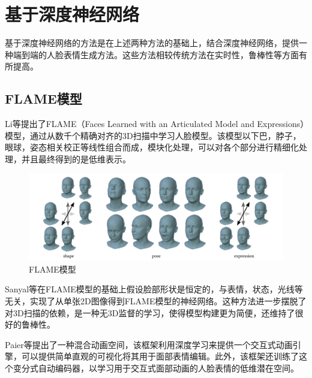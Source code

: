 \documentclass{ctexart}
\begin{document}
\section{\hei 基于深度神经网络}
基于深度神经网络的方法是在上述两种方法的基础上，结合深度神经网络，提供一种端到端的人脸表情生成方法。这些方法相较传统方法在实时性，鲁棒性等方面有所提高。\par
\subsection{\hei FLAME模型}
Li等\cite{20}提出了FLAME（Faces Learned with an Articulated Model and Expressions）模型，通过从数千个精确对齐的3D扫描中学习人脸模型。该模型以下巴，脖子，眼球，姿态相关校正等线性组合而成，模块化处理，可以对各个部分进行精细化处理，并且最终得到的是低维表示。\par
\begin{figure}[htbp]	
	\centering	
	
			\includegraphics[scale=0.5]{8.png}
	\caption{FLAME模型}
\end{figure}
Sanyal等\cite{21}在FLAME模型的基础上假设脸部形状是恒定的，与表情，状态，光线等无关，实现了从单张2D图像得到FLAME模型的神经网络。这种方法进一步摆脱了对3D扫描的依赖，是一种无3D监督的学习，使得模型构建更为简便，还维持了很好的鲁棒性。\par
Paier等\cite{22}提出了一种混合动画空间，该框架利用深度学习来提供一个交互式动画引擎，可以提供简单直观的可视化将其用于面部表情编辑。此外，该框架还训练了这个变分式自动编码器，以学习用于交互式面部动画的人脸表情的低维潜在空间。
\par
\end{document}
